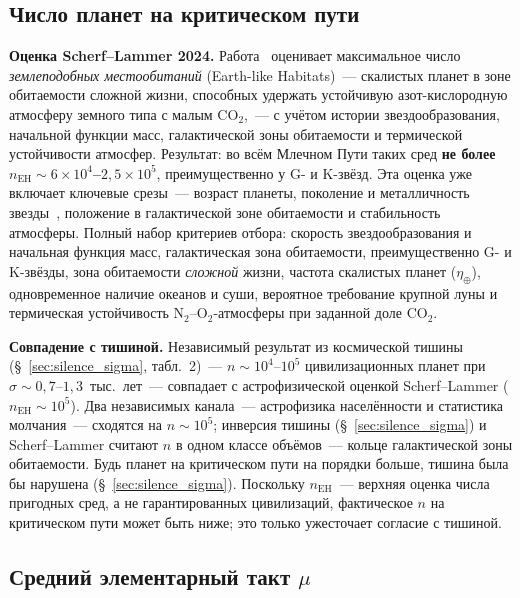 \documentclass[12pt,a4paper]{article}
\begin{document}
\subsection{Число планет на критическом пути}
\label{sec:kepler}

\textbf{Оценка Scherf--Lammer 2024.} Работа~\cite{Scherf2024,Lammer2024} оценивает максимальное число \emph{землеподобных местообитаний} (Earth-like Habitats)~--- скалистых планет в зоне обитаемости сложной жизни, способных удержать устойчивую азот-кислородную атмосферу земного типа с малым $\mathrm{CO_2}$,~--- с учётом истории звездообразования, начальной функции масс, галактической зоны обитаемости и термической устойчивости атмосфер. Результат: во всём Млечном Пути таких сред \textbf{не более $n_{\text{EH}} \sim 6\times10^4$--$2{,}5\times10^5$}, преимущественно у G- и K-звёзд. Эта оценка уже включает ключевые срезы~--- возраст планеты, поколение и металличность звезды~\cite{Lineweaver2001,Behroozi2015}, положение в галактической зоне обитаемости и стабильность атмосферы. Полный набор критериев отбора: скорость звездообразования и начальная функция масс, галактическая зона обитаемости, преимущественно G- и K-звёзды, зона обитаемости \emph{сложной} жизни, частота скалистых планет ($\eta_\oplus$), одновременное наличие океанов и суши, вероятное требование крупной луны и термическая устойчивость N$_2$--O$_2$-атмосферы при заданной доле CO$_2$.

\textbf{Совпадение с тишиной.} Независимый результат из космической тишины (\S~\ref{sec:silence_sigma}, табл.~2)~--- $n \sim 10^4$--$10^5$ цивилизационных планет при $\sigma \sim 0{,}7$--$1{,}3$~тыс.~лет~--- совпадает с астрофизической оценкой Scherf--Lammer ($n_{\text{EH}} \sim 10^5$). Два независимых канала~--- астрофизика населённости и статистика молчания~--- сходятся на $n \sim 10^5$; инверсия тишины (\S~\ref{sec:silence_sigma}) и Scherf--Lammer считают $n$ в одном классе объёмов~--- кольце галактической зоны обитаемости. Будь планет на критическом пути на порядки больше, тишина была бы нарушена (\S~\ref{sec:silence_sigma}). Поскольку $n_{\text{EH}}$~--- верхняя оценка числа пригодных сред, а не гарантированных цивилизаций, фактическое $n$ на критическом пути может быть ниже; это только ужесточает согласие с тишиной.

\subsection{Средний элементарный такт \texorpdfstring{$\mu$}{μ}}
\label{sec:mu_from_sigma}
\end{document}
